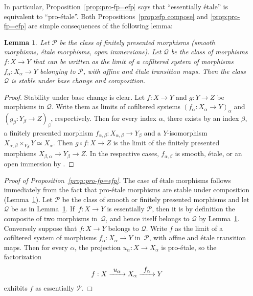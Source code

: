 \documentclass[JEP,XML,SOM,Unicode]{cedram}
\def\To#1{\mathchoice{\xrightarrow{\textstyle\kern4pt#1\kern3pt}}{\stackrel{#1}{\longrightarrow}}{}{}}
\newtheorem{lm}[thm]{Lemma}
\theoremstyle{remark}
\theoremstyle{definition}
\numberwithin{equation}{thm}
\begin{document}
In particular, Proposition~\ref{prop:pro-fp=efp} says that ``essentially étale'' is equivalent to ``pro-étale''.
Both Propositions~\ref{prop:efp compose} and \ref{prop:pro-fp=efp} are simple consequences of the following lemma:

\begin{lm}\label{lm:pro-et composition}
Let $\mathcal{P}$ be the class of finitely presented morphisms (\resp smooth morphisms, étale morphisms, open immersions).
Let $\mathcal{Q}$ be the class of morphisms \hbox{$f : X \to Y$} that can be written as the limit of a cofiltered system of morphisms $f_\alpha : X_\alpha \to Y$ belonging to $\mathcal{P}$, with affine and étale transition maps.
Then the class $\mathcal{Q}$ is stable under base change and composition.
\end{lm}
\begin{proof}
Stability under base change is clear.
Let $f : X \to Y$ and $g : Y \to Z$ be morphisms in $\mathcal{Q}$.
Write them as limits of cofiltered systems $(f_\alpha : X_\alpha \to Y)_\alpha$ and $(g_\beta : Y_\beta \to Z)_\beta$, respectively.
Then for every index $\alpha$, there exists by \cite[Th.\,8.8.2(ii)]{EGA4} an index $\beta$, a finitely presented morphism $f_{\alpha,\beta} : X_{\alpha,\beta} \to Y_\beta$ and a $Y$\nobreakdash-isomorphism $X_{\alpha,\beta} \times_{Y_\beta} Y \simeq X_\alpha$.
Then $g\circ f : X \to Z$ is the limit of the finitely presented morphisms $X_{\beta,\alpha} \to Y_\beta \to Z$.
In the respective cases, $f_{\alpha,\beta}$ is smooth, étale, or an open immersion by \cite[Prop.\,17.7.8 or Prop.\,8.6.3]{EGA4}.
\end{proof}

\begin{proof}[Proof of Proposition~\ref{prop:pro-fp=efp}]
The case of étale morphisms follows immediately from the fact that pro-étale morphisms are stable under composition (Lemma~\ref{lm:pro-et composition}).
Let $\mathcal{P}$ be the class of smooth or finitely presented morphisms and let $\mathcal{Q}$ be as in Lemma~\ref{lm:pro-et composition}.
If~$f : X \to Y$ is essentially $\mathcal{P}$, then it is by definition the composite of two morphisms in~$\mathcal{Q}$, and hence itself belongs to $\mathcal{Q}$ by Lemma~\ref{lm:pro-et composition}.
Conversely suppose that \hbox{$f : X \to Y$} belongs to $\mathcal{Q}$.
Write $f$ as the limit of a cofiltered system of morphisms $f_\alpha : X_\alpha \to Y$ in~$\mathcal{P}$, with affine and étale transition maps.
Then for every $\alpha$, the projection \hbox{$u_\alpha : X \to X_\alpha$} is pro-étale, so the factorization
\[
f : X \To{u_\alpha} X_\alpha \To{f_\alpha} Y
\]
exhibits $f$ as essentially $\mathcal{P}$.
\end{proof}
\end{document}
